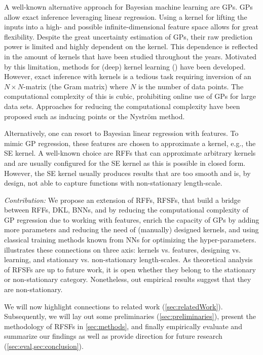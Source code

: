 A well-known alternative approach for Bayesian machine learning are \acp{GP}.
\aclp{GP} allow exact inference leveraging linear regression.
Using a kernel for lifting the inputs into a high- and possible infinite-dimensional feature space allows for great flexibility.
Despite the great uncertainty estimation of \acp{GP}, their raw prediction power is limited and highly dependent on the kernel.
This dependence is reflected in the amount of kernels that have been studied throughout the years\cite[ch.\,2]{duvenaudAutomaticModelConstruction2014}.
Motivated by this limitation, methods for (deep) kernel learning () have been developed\cite{wilsonDeepKernelLearning2016,calandraManifoldGaussianProcesses2016,jacotNeuralTangentKernel2020}.
However, exact inference with kernels is a tedious task requiring inversion of an \(N \times N\)-matrix (the Gram matrix) where \(N\) is the number of data points.
The computational complexity of this is cubic, prohibiting online use of \acp{GP} for large data sets\cite{rahimiRandomFeaturesLargeScale2007}.
Approaches for reducing the computational complexity have been proposed such as inducing points\cite{snelsonSparseGaussianProcesses2005} or the Nyström method\cite{nystromUberPraktischeAuflosung1930,sunReviewNystromMethods2015}.

Alternatively, one can resort to Bayesian linear regression with features.
To mimic \ac{GP} regression, these features are chosen to approximate a kernel, e.g., the \ac{SE} kernel.
A well-known choice are \acp{RFF} that can approximate arbitrary kernels and are usually configured for the \ac{SE} kernel as this is possible in closed form\cite{rahimiRandomFeaturesLargeScale2007}.
However, the \ac{SE} kernel usually produces results that are too smooth\cite{steinInterpolationSpatialData1999} and is, by design, not able to capture functions with non-stationary length-scale.

\emph{Contribution:} We propose an extension of \acp{RFF}, \acp{RFSF}, that build a bridge between \acp{RFF}, \ac{DKL}, \acp{BNN}, and  by reducing the computational complexity of \ac{GP} regression due to working with features, enrich the capacity of \acp{GP} by adding more parameters and reducing the need of (manually) designed kernels, and using classical training methods known from \acp{NN} for optimizing the hyper-parameters.
 illustrates these connections on three axis: kernels vs. features, designing vs. learning, and stationary vs. non-stationary length-scales.
As theoretical analysis of \acp{RFSF} are up to future work, it is open whether they belong to the stationary or non-stationary category.
Nonetheless, out empirical results suggest that they are non-stationary.

We will now highlight connections to related work (\cref{sec:relatedWork}).
Subsequently, we will lay out some preliminaries (\cref{sec:preliminaries}), present the methodology of \acp{RFSF} in \cref{sec:methods}, and finally empirically evaluate and summarize our findings as well as provide direction for future research (\cref{sec:eval,sec:conclusion}).
